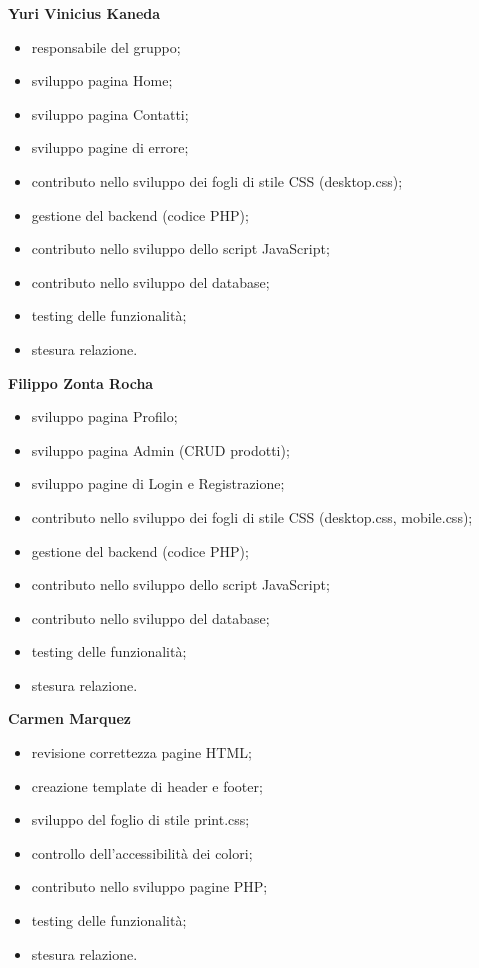 \documentclass[11pt,a4paper]{article}
\begin{document}
\textbf{Yuri Vinicius Kaneda}
\begin{itemize}
  \item responsabile del gruppo;
  \item sviluppo pagina Home;
  \item sviluppo pagina Contatti;
  \item sviluppo pagine di errore;
  \item contributo nello sviluppo dei fogli di stile CSS (desktop.css);
  \item gestione del backend (codice PHP);
  \item contributo nello sviluppo dello script JavaScript;
  \item contributo nello sviluppo del database;
  \item testing delle funzionalit\`a;
  \item stesura relazione.
\end{itemize}

\textbf{Filippo Zonta Rocha}
\begin{itemize}
  \item sviluppo pagina Profilo;
  \item sviluppo pagina Admin (CRUD prodotti);
  \item sviluppo pagine di Login e Registrazione;
  \item contributo nello sviluppo dei fogli di stile CSS (desktop.css, mobile.css);
  \item gestione del backend (codice PHP);
  \item contributo nello sviluppo dello script JavaScript;
  \item contributo nello sviluppo del database;
  \item testing delle funzionalit\`a;
  \item stesura relazione.
\end{itemize}

\textbf{Carmen Marquez}
\begin{itemize}
  \item revisione correttezza pagine HTML;
  \item creazione template di header e footer;
  \item sviluppo del foglio di stile print.css;
  \item controllo dell'accessibilit\`a dei colori;
  \item contributo nello sviluppo pagine PHP;
  \item testing delle funzionalit\`a;
  \item stesura relazione.
\end{itemize}
\end{document}
